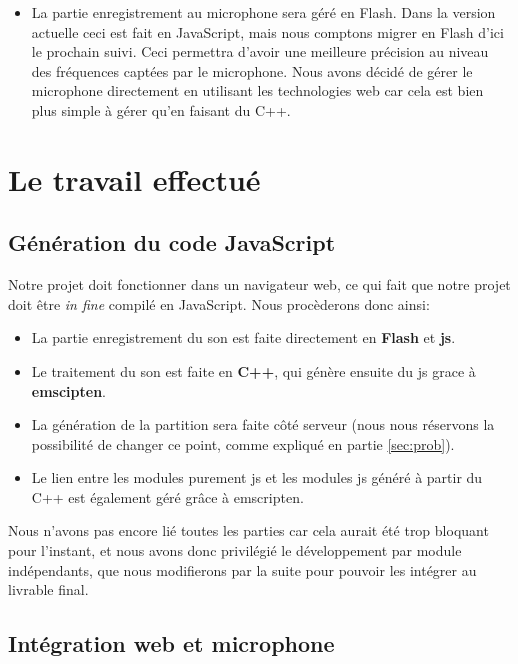\documentclass[12pt]{article}
\begin{document}
\begin{itemize}
\begin{enumerate}
\end{enumerate}

\item La partie enregistrement au microphone sera géré en Flash. Dans la version actuelle ceci est fait en JavaScript, mais nous comptons migrer en Flash d'ici le prochain suivi. Ceci permettra d'avoir une meilleure précision au niveau des fréquences captées par le microphone. Nous avons décidé de gérer le microphone directement en utilisant les technologies web car cela est bien plus simple à gérer qu'en faisant du C++.

\end{itemize}

\section{Le travail effectué}

\subsection{Génération du code JavaScript}

\par Notre projet doit fonctionner dans un navigateur web, ce qui fait que notre projet doit être \emph{in fine} compilé en JavaScript. Nous procèderons donc ainsi:
\begin{itemize}

\item La partie enregistrement du son est faite directement en \textbf{Flash} et \textbf{js}.
\item Le traitement du son est faite en \textbf{C++}, qui génère ensuite du js grace à \textbf{emscipten}.
\item La génération de la partition sera faite côté serveur (nous nous réservons la possibilité de changer ce point, comme expliqué en partie \ref{sec:prob}).
\item Le lien entre les modules purement js et les modules js généré à partir du C++ est également géré grâce à emscripten.

\end{itemize}

\par Nous n'avons pas encore lié toutes les parties car cela aurait été trop bloquant pour l'instant, et nous avons donc privilégié le développement par module indépendants, que nous modifierons par la suite pour pouvoir les intégrer au livrable final.

\subsection{Intégration web et microphone}
\end{document}
